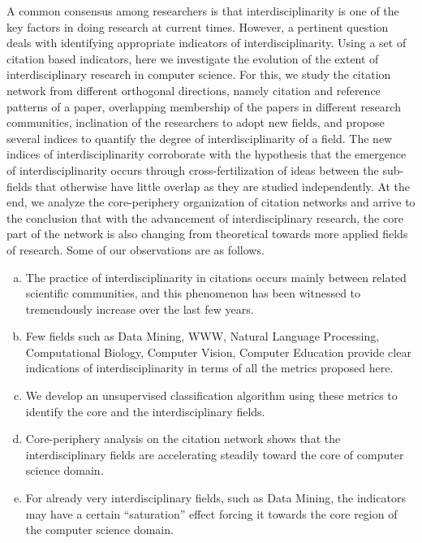  
A common consensus among researchers is that interdisciplinarity is one of the key factors in doing research at current times. However, a
pertinent question deals with identifying appropriate indicators of interdisciplinarity. Using a set of citation
based indicators, here we investigate the evolution of the extent of interdisciplinary research in computer science. For this, we
study the citation network from different orthogonal directions, namely citation and reference patterns of a paper, overlapping membership
of the papers in different research communities, inclination of the researchers to adopt new fields, and propose several indices to
quantify the degree of interdisciplinarity of a field. The new indices of interdisciplinarity corroborate with the hypothesis
that the emergence of interdisciplinarity occurs through cross-fertilization of ideas between the sub-fields that otherwise have
little overlap as they are studied independently. At the end, we analyze the core-periphery organization of citation networks
and arrive to the conclusion that with the advancement of interdisciplinary research, the core part of the network is also
changing from theoretical towards more applied fields of research. Some of our observations are as follows.

\begin{enumerate}[(a)]
 \item The practice of interdisciplinarity in citations occurs mainly between related scientific communities, and this phenomenon has been
witnessed to tremendously increase over the last few years.

\item Few fields such as Data Mining, WWW, Natural Language Processing, Computational Biology, Computer Vision, Computer Education provide
clear indications of interdisciplinarity in terms of all the metrics proposed here.

\item We develop an unsupervised classification algorithm using these metrics to identify the core and the interdisciplinary fields.

\item Core-periphery analysis on the citation network shows that the interdisciplinary fields are accelerating steadily toward the core of
computer science domain. 

\item For already very interdisciplinary fields, such as Data Mining, the indicators may have a certain ``saturation'' effect forcing it
towards the core region of the computer science domain.


\end{enumerate}


